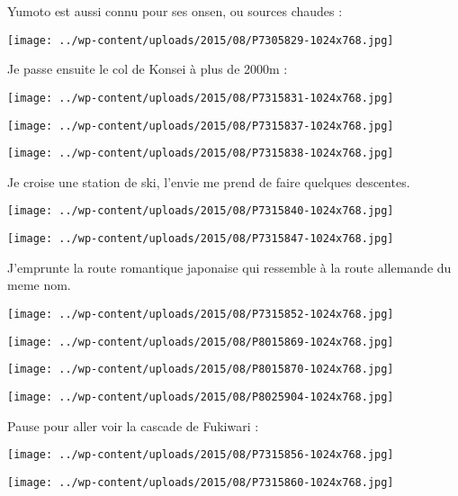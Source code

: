 \pagebreak
 Yumoto est aussi connu pour ses onsen, ou sources chaudes :
\begin{center} \texttt{[image: ../wp-content/uploads/2015/08/P7305829-1024x768.jpg]} \end{center}

 Je passe ensuite le col de Konsei à plus de 2000m :
\begin{center} \texttt{[image: ../wp-content/uploads/2015/08/P7315831-1024x768.jpg]} \end{center}
\begin{center} \texttt{[image: ../wp-content/uploads/2015/08/P7315837-1024x768.jpg]} \end{center}
\begin{center} \texttt{[image: ../wp-content/uploads/2015/08/P7315838-1024x768.jpg]} \end{center}

\pagebreak
 Je croise une station de ski, l'envie me prend de faire quelques descentes. 
\begin{center} \texttt{[image: ../wp-content/uploads/2015/08/P7315840-1024x768.jpg]} \end{center}
\begin{center} \texttt{[image: ../wp-content/uploads/2015/08/P7315847-1024x768.jpg]} \end{center}

\pagebreak
 J'emprunte la route romantique japonaise qui ressemble à la route allemande du meme nom. 
\begin{center} \texttt{[image: ../wp-content/uploads/2015/08/P7315852-1024x768.jpg]} \end{center}
\begin{center} \texttt{[image: ../wp-content/uploads/2015/08/P8015869-1024x768.jpg]} \end{center}
\begin{center} \texttt{[image: ../wp-content/uploads/2015/08/P8015870-1024x768.jpg]} \end{center}
\begin{center} \texttt{[image: ../wp-content/uploads/2015/08/P8025904-1024x768.jpg]} \end{center}

\pagebreak
 Pause pour aller voir la cascade de Fukiwari :
\begin{center} \texttt{[image: ../wp-content/uploads/2015/08/P7315856-1024x768.jpg]} \end{center}
\begin{center} \texttt{[image: ../wp-content/uploads/2015/08/P7315860-1024x768.jpg]} \end{center}

